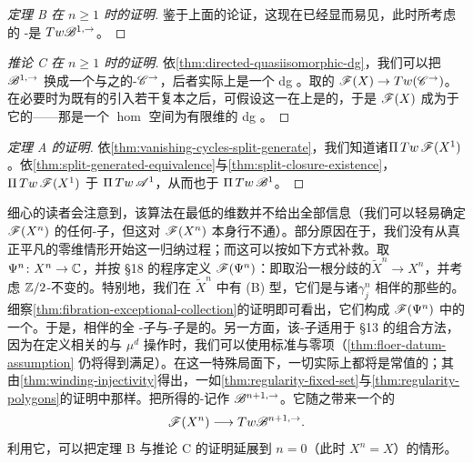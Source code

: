\begin{proof}[定理 B 在 $n\ge 1$ 时的证明]
鉴于上面的论证，这现在已经显而易见，此时所考虑的 \trAinfty-\trCategory{}是 $Tw\mathscr{B}^{1,\rightarrow}$。
\end{proof}
\begin{proof}[推论 C 在 $n\ge 1$ 时的证明]
依\cref{thm:directed-quasiisomorphic-dg}，我们可以把 $\mathscr{B}^{1,\rightarrow}$ 换成一个与之\trQuasiisomorphic{}的\trDirected{}\trAinfty-\trCategory{}$\mathscr{C}^{\rightarrow}$，后者实际上是一个 dg \trCategory。取\trCohomology{}\trFullyFaithful{}的 \trAFunctor{}$\mathscr{F}(X)\to Tw(\mathscr{C}^{\rightarrow})$。在必要时为既有的\trObject{}引入若干复本之后，可假设这一\trFunctor{}在\trObject{}上是\trInjective{}的，于是 $\mathscr{F}(X)$ 成为\trQuasiisomorphic{}于它的\trImage{}——那是一个 $\hom$ 空间为有限维的 dg \trCategory。
\end{proof}
\begin{proof}[定理 A 的证明]
依\cref{thm:vanishing-cycles-split-generate}，我们知道诸\trVanishingCycle{}\trSplitGeneration{}$\Pi\,Tw\,\mathscr{F}(X^1)$。依\cref{thm:split-generated-equivalence}与\cref{thm:split-closure-existence}，$\Pi\,Tw\,\mathscr{F}(X^1)$ \trQuasiequivalent{}于 $\Pi\,Tw\,\mathscr{A}^1$，从而也\trQuasiequivalent{}于 $\Pi\,Tw\,\mathscr{B}^1$。
\end{proof}

细心的读者会注意到，该算法在最低的维数并不给出全部信息（我们可以轻易确定 $\mathscr{F}(X^n)$ 的任何\trDirected{}\trAinfty-子\trCategory，但这\trApriori{}对 $\mathscr{F}(X^n)$ 本身行不通）。部分原因在于，我们没有从真正平凡的零维情形开始这一归纳过程；而这可以按如下方式补救。取 $\Psi^n\colon X^n\to\mathbb{C}$，并按 §18 的程序定义 $\mathscr{F}(\Psi^n)$：即取沿一根\trSmooth\trFiber{}分歧的\trDoubleCover{}$\widetilde{X}^n\to X^n$，并考虑 $\mathbb{Z}/2$-不变的\trLagrange\trSubmanifold。特别地，我们在 $\widetilde{X}^n$ 中有 (B) 型\trEquivariant\trBrane，它们是与诸\trVanishingPath{}$\gamma^n_j$ 相伴的那些\trLefschetzThimble{}的\trPreimage。细察\cref{thm:fibration-exceptional-collection}的证明即可看出，它们构成 $\mathscr{F}(\Psi^n)$ 中的一个\trExceptionalCollection。于是，相伴的全 \trAinfty-子\trCategory{}与\trDirected{}\trAinfty-子\trCategory{}是\trQuasiisomorphic{}的。另一方面，该\trDirected{}\trAinfty-子\trCategory{}适用于 §13 的组合方法，因为在定义相关的\trFloerCochainGroup{}与 $\mu^d$ 操作时，我们可以使用标准\trComplexStructure{}与零\trInhomogeneous{}项（\cref{thm:floer-datum-assumption} 仍将得到满足）。在这一特殊局面下，一切\trPseudoholomorphic\trPolygon{}实际上都将是常值的；其\trRegularity{}由\cref{thm:winding-injectivity}得出，一如\cref{thm:regularity-fixed-set}与\cref{thm:regularity-polygons}的证明中那样。把所得的\trDirected{}\trAinfty-\trCategory{}记作 $\mathscr{B}^{n+1,\rightarrow}$。它随之带来一个\trCohomology{}\trFullyFaithful{}的\trFunctor
\begin{equation}\label{eq:fukaya-functor-zero-dimension}
\mathscr{F}(X^n)\longrightarrow Tw\mathscr{B}^{n+1,\rightarrow}.
\end{equation}
利用它，可以把定理 B 与推论 C 的证明延展到 $n=0$（此时 $X^n=X$）的情形。

